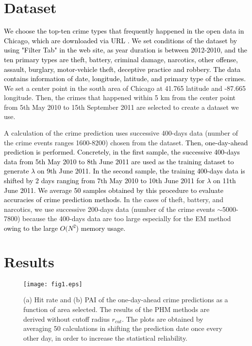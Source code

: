 \documentclass[review]{elsarticle}
\newcommand{\red}[1]{\textcolor{black}{#1}}
\newcommand{\blue}[1]{\textcolor{black}{#1}}
\begin{document}
\section{Dataset}\label{sec:dataset}
\blue{
We choose the top-ten crime types 
that frequently happened in the open data in
Chicago, which are
downloaded via URL \cite{chicago_opendata}.
 We set conditions of the dataset  
 by using "Filter Tab" in the web site, as year duration is between 2012-2010, 
 and the ten primary types are
theft, battery, criminal damage, narcotics, other offense, assault, burglary,
motor-vehicle theft, deceptive practice and robbery.
The data contains information of date, longitude, latitude, and primary type of the crimes.
}
We set a center point
in the south area of Chicago at 41.765 latitude and -87.665 longitude.
Then, the crimes that happened 
within 5 km from the center point
from 5th May 2010 to 15th September 2011
are selected to create a dataset we use.

A calculation of the crime prediction
uses successive 400-days data  (number of the crime events ranges 1600-8200)
 chosen from the dataset.
  \red{
Then,  one-day-ahead prediction is performed.
Concretely,
in the first sample, the successive 400-days data
from 5th May 2010 to 8th June 2011 are used as the training dataset
to generate $\lambda$ on 9th June 2011.
In the second sample, 
the training 400-days data 
is shifted by 2 days ranging from 7th May 2010 to 10th June 2011
 for $\lambda$  on 11th June 2011.
We average 50 samples obtained by this procedure to evaluate accuracies of crime prediction methods.
}
 In the cases of theft, battery, and narcotics, 
 we use successive 200-days data (number of the crime events $\sim$5000-7800) because the  400-days data are too large 
 especially for the EM method 
 \red{
 owing to the large $O(N^2$) memory usage.
 }



\section{Results}\label{sec:rd}

\begin{figure}[]
\centering
\texttt{[image: fig1.eps]}
\caption{
   (a) Hit rate and (b) PAI of the one-day-ahead crime predictions as a function of area selected.
   The results of the PHM methods are derived without cutoff radius $r_{cut}$.
The plots are obtained by averaging 50 calculations in shifting 
the prediction date once every other day,
in order to increase the statistical reliability.
  }
  \label{fig1}
\end{figure}
\end{document}
